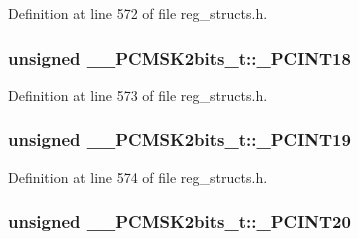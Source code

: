 Definition at line 572 of file reg\+\_\+structs.\+h.

\hypertarget{union_____p_c_m_s_k2bits__t_a96ef0e09870b853c278d59c4baac4774}{
\subsubsection[{\+\_\+\+P\+C\+I\+N\+T18}]{\setlength{\rightskip}{0pt plus 5cm}unsigned \+\_\+\+\_\+\+P\+C\+M\+S\+K2bits\+\_\+t\+::\+\_\+\+P\+C\+I\+N\+T18}}\label{union_____p_c_m_s_k2bits__t_a96ef0e09870b853c278d59c4baac4774}


Definition at line 573 of file reg\+\_\+structs.\+h.

\hypertarget{union_____p_c_m_s_k2bits__t_a5ae73bbbbe60bb23a6ebb363275b4dca}{
\subsubsection[{\+\_\+\+P\+C\+I\+N\+T19}]{\setlength{\rightskip}{0pt plus 5cm}unsigned \+\_\+\+\_\+\+P\+C\+M\+S\+K2bits\+\_\+t\+::\+\_\+\+P\+C\+I\+N\+T19}}\label{union_____p_c_m_s_k2bits__t_a5ae73bbbbe60bb23a6ebb363275b4dca}


Definition at line 574 of file reg\+\_\+structs.\+h.

\hypertarget{union_____p_c_m_s_k2bits__t_a0be135408a50f85dfbd752bc2706d875}{
\subsubsection[{\+\_\+\+P\+C\+I\+N\+T20}]{\setlength{\rightskip}{0pt plus 5cm}unsigned \+\_\+\+\_\+\+P\+C\+M\+S\+K2bits\+\_\+t\+::\+\_\+\+P\+C\+I\+N\+T20}}\label{union_____p_c_m_s_k2bits__t_a0be135408a50f85dfbd752bc2706d875}


